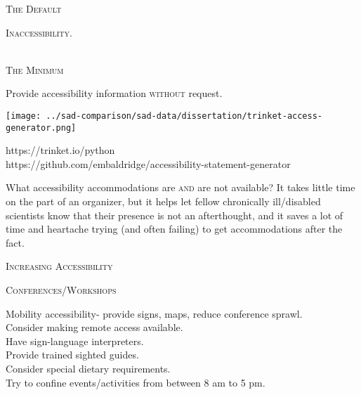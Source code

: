 \documentclass{beamer}
\begin{document}
\begin{center}
\begin{minipage}{0.25\linewidth}
\begin{Large}
\textsc{The Default}
\begin{center}
\textsc{Inaccessibility.}\\
~\\
\end{center}
\end{Large}
\begin{Large}
\textsc{The Minimum}\\
\end{Large}
Provide accessibility information \textsc{without} request.\\
\begin{center}
\texttt{[image: ../sad-comparison/sad-data/dissertation/trinket-access-generator.png]}\\
\begin{small}
https://trinket.io/python\\
https://github.com/embaldridge/accessibility-statement-generator\\
\end{small}
\end{center}
What accessibility accommodations are \textsc{and} are not available?  It takes little time on the part of an organizer, but it helps let fellow chronically ill/disabled scientists know that their presence is not an afterthought, and it saves a lot of time and heartache trying (and often failing) to get accommodations after the fact.
\end{minipage}
\hspace{1cm}
\begin{minipage}{0.42\linewidth}
\vspace{0.5cm}
\begin{center}
\begin{huge}
\textsc{Increasing Accessibility\\}
\end{huge}
\end{center}
\begin{Large}
\textsc{Conferences/Workshops\\}
\end{Large}
Mobility accessibility- provide signs, maps, reduce conference sprawl.\\
Consider making remote access available.\\
Have sign-language interpreters.\\
Provide trained sighted guides.\\
Consider special dietary requirements.\\
Try to confine events/activities from between 8 am to 5 pm.\\


\end{minipage}
\end{center}
\end{document}
